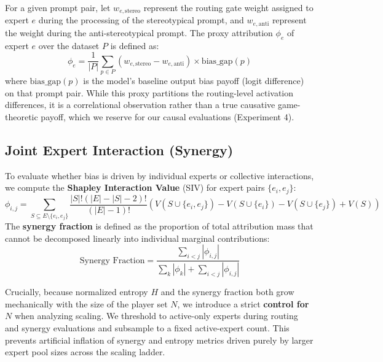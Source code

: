 \documentclass[11pt,a4paper]{article}
\begin{document}
For a given prompt pair, let $w_{e,\text{stereo}}$ represent the routing gate weight assigned to expert $e$ during the processing of the stereotypical prompt, and $w_{e,\text{anti}}$ represent the weight during the anti-stereotypical prompt. The proxy attribution $\phi_e$ of expert $e$ over the dataset $P$ is defined as:
$$\phi_e = \frac{1}{|P|} \sum_{p \in P} (w_{e,\text{stereo}} - w_{e,\text{anti}}) \times \text{bias\_gap}(p)$$
where $\text{bias\_gap}(p)$ is the model's baseline output bias payoff (logit difference) on that prompt pair. While this proxy partitions the routing-level activation differences, it is a correlational observation rather than a true causative game-theoretic payoff, which we reserve for our causal evaluations (Experiment 4).

\subsection{Joint Expert Interaction (Synergy)}
To evaluate whether bias is driven by individual experts or collective interactions, we compute the \textbf{Shapley Interaction Value} (SIV) \cite{realexp} for expert pairs $\{e_i, e_j\}$:
$$\phi_{i,j} = \sum_{S \subseteq E \setminus \{e_i, e_j\}} \frac{|S|! (|E| - |S| - 2)!}{(|E|-1)!} \left( V(S \cup \{e_i, e_j\}) - V(S \cup \{e_i\}) - V(S \cup \{e_j\}) + V(S) \right)$$
The \textbf{synergy fraction} is defined as the proportion of total attribution mass that cannot be decomposed linearly into individual marginal contributions:
$$\text{Synergy Fraction} = \frac{\sum_{i < j} |\phi_{i,j}|}{\sum_{k} |\phi_k| + \sum_{i < j} |\phi_{i,j}|}$$

Crucially, because normalized entropy $H$ and the synergy fraction both grow mechanically with the size of the player set $N$, we introduce a strict \textbf{control for $N$} when analyzing scaling. We threshold to active-only experts during routing and synergy evaluations and subsample to a fixed active-expert count. This prevents artificial inflation of synergy and entropy metrics driven purely by larger expert pool sizes across the scaling ladder.
\end{document}
